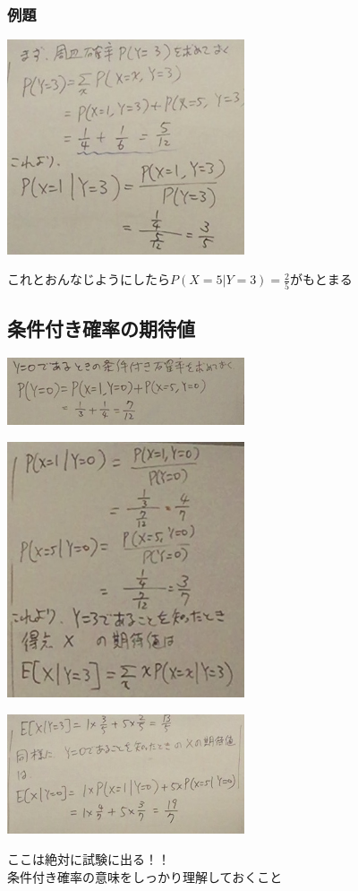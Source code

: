 \documentclass{jsarticle}
\begin{document}
	\subsubsection{例題}
	\begin{center}
		\includegraphics[width=7cm]{11_30_5.JPG}
	\end{center}
	これとおんなじようにしたら$P(X=5|Y=3)=\frac{2}{5}$がもとまる
\subsection{条件付き確率の期待値}
	\begin{center}
		\includegraphics[width=7cm]{11_30_E.JPG}
	\end{center}
	\begin{center}
		\includegraphics[width=7cm]{11_30_E2.JPG}
	\end{center}
	\begin{center}
		\includegraphics[width=7cm]{11_30_E3.JPG}
	\end{center}
	ここは絶対に試験に出る！！\\
	条件付き確率の意味をしっかり理解しておくこと
	
\end{document}
